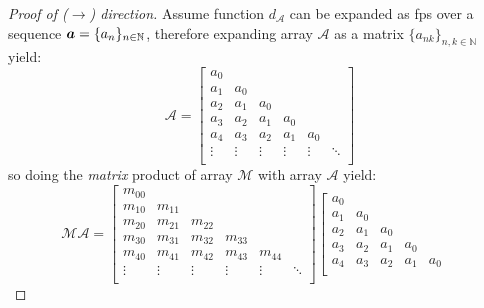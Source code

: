 \begin{proof}[Proof of ($\rightarrow$) direction]
    Assume function $d_{\mathcal{A}}$ can be expanded as \ac{fps} over a sequence
    $\boldsymbol{a}=\lbrace a_{n}\rbrace_{n\in\mathbb{N}}$, therefore expanding array $\mathcal{A}$
    as a matrix $\lbrace a_{nk}\rbrace_{n,k\in\mathbb{N}}$ yield:
    \begin{displaymath}
        \mathcal{A} =
        \left[
            \begin{array}{cccccc}
                a_{0} & & & &  &\\
                a_{1} & a_{0} & & &  &\\
                a_{2} & a_{1}& a_{0}& &  &\\
                a_{3} & a_{2}& a_{1}& a_{0}&  &\\
                a_{4} & a_{3}& a_{2}& a_{1}& a_{0} &\\
                \vdots & \vdots& \vdots& \vdots& \vdots & \ddots\\
            \end{array}
        \right]
    \end{displaymath}
    so doing the \emph{matrix} product of array $\mathcal{M}$ with array $\mathcal{A}$ yield:
    \begin{displaymath}
        \mathcal{M}\mathcal{A}
        = 
        \left[
            \begin{array}{cccccc}
                m_{00} & & & &  &\\
                m_{10} & m_{11} & & &  &\\
                m_{20} & m_{21}& m_{22}& &  &\\
                m_{30} & m_{31}& m_{32}& m_{33}&  &\\
                m_{40} & m_{41}& m_{42}& m_{43}& m_{44} &\\
                \vdots & \vdots& \vdots& \vdots& \vdots & \ddots\\
            \end{array}
        \right]
        \left[
            \begin{array}{cccccc}
                a_{0} & & & &  &\\
                a_{1} & a_{0} & & &  &\\
                a_{2} & a_{1}& a_{0}& &  &\\
                a_{3} & a_{2}& a_{1}& a_{0}&  &\\
                a_{4} & a_{3}& a_{2}& a_{1}& a_{0} &\\

\end{array}
\end{displaymath}
\end{proof}
